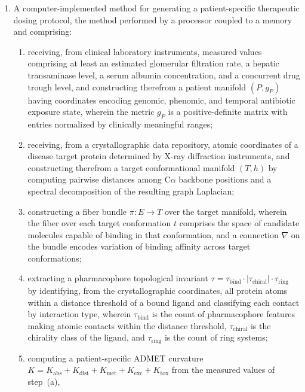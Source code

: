 \documentclass[11pt]{article}
\begin{document}
\begin{enumerate}[label=\textbf{\arabic*.}, leftmargin=*, itemsep=1em]

\item A computer-implemented method for generating a patient-specific therapeutic dosing
protocol, the method performed by a processor coupled to a memory and comprising:
\begin{enumerate}[label=(\alph*)]
    \item receiving, from clinical laboratory instruments, measured values comprising at least
    an estimated glomerular filtration rate, a hepatic transaminase level, a serum albumin
    concentration, and a concurrent drug trough level, and constructing therefrom a patient
    manifold $(P, g_P)$ having coordinates encoding genomic, phenomic, and temporal antibiotic
    exposure state, wherein the metric $g_P$ is a positive-definite matrix with entries
    normalized by clinically meaningful ranges;
    \item receiving, from a crystallographic data repository, atomic coordinates of a disease
    target protein determined by X-ray diffraction instruments, and constructing therefrom a
    target conformational manifold $(T, h)$ by computing pairwise distances among
    C$\alpha$ backbone positions and a spectral decomposition of the resulting graph Laplacian;
    \item constructing a fiber bundle $\pi: E \to T$ over the target manifold, wherein the
    fiber over each target conformation $t$ comprises the space of candidate molecules capable
    of binding in that conformation, and a connection $\nabla$ on the bundle encodes variation
    of binding affinity across target conformations;
    \item extracting a pharmacophore topological invariant $\tau = \tau_{\text{bind}} \cdot
    |\tau_{\text{chiral}}| \cdot \tau_{\text{ring}}$ by identifying, from the crystallographic
    coordinates, all protein atoms within a distance threshold of a bound ligand and classifying
    each contact by interaction type, wherein $\tau_{\text{bind}}$ is the count of
    pharmacophore features making atomic contacts within the distance threshold, $\tau_{\text{chiral}}$
    is the chirality class of the ligand, and $\tau_{\text{ring}}$ is the count of ring systems;
    \item computing a patient-specific ADMET curvature $K = K_{\text{abs}} + K_{\text{dist}}
    + K_{\text{met}} + K_{\text{exc}} + K_{\text{tox}}$ from the measured values of step~(a),

\end{enumerate}
\end{enumerate}
\end{document}
